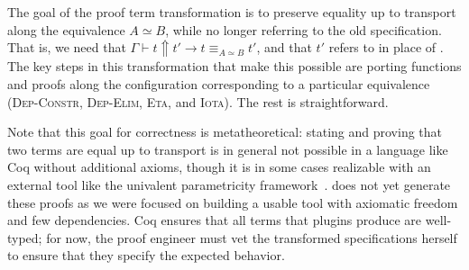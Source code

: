 The goal of the proof term transformation is to preserve equality up to transport along the equivalence $A \simeq B$,
while no longer referring to the old specification.
That is, we need that $\Gamma \vdash t \Uparrow t' \rightarrow t \equiv_{A \simeq B} t'$, and that $t'$ refers to \B in place of \A.
The key steps in this transformation that make this possible are porting functions and proofs along the configuration corresponding
to a particular equivalence (\textsc{Dep-Constr}, \textsc{Dep-Elim}, \textsc{Eta}, and \textsc{Iota}).
The rest is straightforward.

Note that this goal for correctness is metatheoretical:
stating and proving that two terms are equal up to transport is in general not possible in a language like Coq
without additional axioms, though it is in some cases realizable with an external tool like the
univalent parametricity framework~\cite{tabareau2017equivalences}.
\toolname does not yet generate these proofs as we were focused on building a usable tool with axiomatic freedom and few dependencies.
Coq ensures that all terms that plugins produce are well-typed; for now, %
the proof engineer must vet the transformed specifications herself to ensure that they specify the expected behavior.


